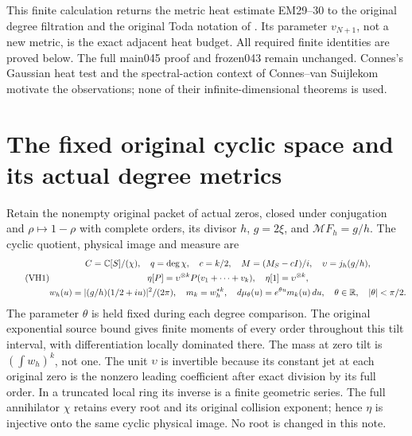 \documentclass[11pt]{article}
\begin{document}
This finite calculation returns the metric heat estimate EM29--30
\cite{hvh:EM} to the original degree filtration and the original Toda
notation of \cite{hvh:TV}. Its parameter \(v_{N+1}\), not a new metric,
is the exact adjacent heat budget. All required finite identities are
proved below. The full main045 proof and frozen043 remain unchanged.
Connes's Gaussian heat test \cite{hvh:Connes} and the spectral-action
context of Connes--van Suijlekom \cite{hvh:CV} motivate the observations;
none of their infinite-dimensional theorems is used.

\section{The fixed original cyclic space and its actual degree metrics}

Retain the nonempty original packet of actual zeros, closed under
conjugation and \(\rho\mapsto1-\rho\) with complete orders, its divisor
\(h\), \(g=2\xi\), and \(\mathcal MF_h=g/h\).
The cyclic quotient, physical image and measure are
\begin{equation}\tag{VH1}\label{hvh:VH1}
\begin{gathered}
C=\mathbb C[S]/(\chi),\quad q=\deg\chi,\quad c=k/2,\quad
M=(M_S-cI)/i,\quad \upsilon=j_h(g/h),\\
\eta[P]=\upsilon^{\otimes k}P(v_1+\cdots+v_k),\quad
\eta[1]=\upsilon^{\otimes k},\\
w_h(u)=|(g/h)(1/2+iu)|^2/(2\pi),\quad m_k=w_h^{*k},\quad
d\mu_\theta(u)=e^{\theta u}m_k(u)\,du,
\quad\theta\in\mathbb R,\quad|\theta|<\pi/2.
\end{gathered}
\end{equation}
The parameter \(\theta\) is held fixed during each degree comparison.
The original exponential source bound gives finite moments of every
order throughout this tilt interval, with differentiation locally
dominated there. The mass at zero tilt is \((\int w_h)^k\), not one.
The unit \(\upsilon\) is invertible because its constant jet at each
original zero is the nonzero leading coefficient after exact division
by its full order. In a truncated local ring its inverse is a finite
geometric series. The full annihilator \(\chi\) retains every root
and its original collision exponent; hence \(\eta\) is injective
onto the same cyclic physical image. No root is changed in this note.
\end{document}

